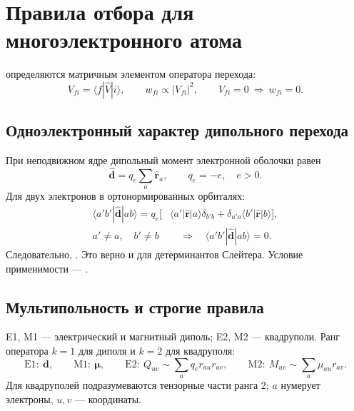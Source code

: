 \documentclass[../final.tex]{subfiles}
\begin{document}
\ifSubfilesClassLoaded{\setcounter{chapter}{3}\setcounter{section}{7}}{}


\section{Правила отбора для многоэлектронного атома}

 определяются матричным элементом оператора
перехода:
\begin{equation*}
    V_{fi}=\langle f|\hat V|i\rangle,\qquad
    w_{fi}\propto|V_{fi}|^2,\qquad V_{fi}=0\ \Rightarrow\ w_{fi}=0.
\end{equation*}

\subsection{Одноэлектронный характер дипольного перехода}

При неподвижном ядре дипольный момент электронной оболочки равен
\begin{equation*}
    \hat{\mathbf d}=q_e\sum_a\hat{\mathbf r}_a,\qquad q_e=-e,\quad e>0.
\end{equation*}
Для двух электронов в ортонормированных орбиталях:
\begin{align*}
    \langle a'b'|\hat{\mathbf d}|ab\rangle
    =q_e\bigl[&\langle a'|\hat{\mathbf r}|a\rangle\delta_{b'b}
    +\delta_{a'a}\langle b'|\hat{\mathbf r}|b\rangle\bigr],\\
    a'\ne a,\quad b'\ne b
    &\quad\Longrightarrow\quad \langle a'b'|\hat{\mathbf d}|ab\rangle=0.
\end{align*}
Следовательно, . Это верно и для детерминантов Слейтера.
Условие применимости --- .

\subsection{Мультипольность и строгие правила}

E1, M1 --- электрический и магнитный диполь; E2, M2 --- квадруполи.
Ранг оператора \(k=1\) для диполя и \(k=2\) для квадруполя:
\begin{equation*}
    \mathrm{E1}:\ \mathbf d,\qquad
    \mathrm{M1}:\ \boldsymbol\mu,\qquad
    \mathrm{E2}:\ Q_{uv}\sim\sum_a q_e r_{au}r_{av},\qquad
    \mathrm{M2}:\ M_{uv}\sim\sum_a\mu_{au}r_{av}.
\end{equation*}
Для квадруполей подразумеваются тензорные части ранга 2;
\(a\) нумерует электроны, \(u,v\) --- координаты.
\end{document}
